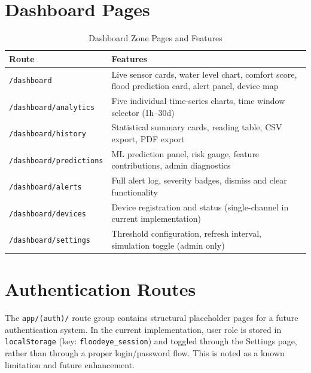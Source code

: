 \section{Dashboard Pages}

\begin{table}[H]
\centering
\caption{Dashboard Zone Pages and Features}
\begin{tabularx}{\linewidth}{|l|X|}
\hline
\rowcolor{FloodLight}
\textbf{Route} & \textbf{Features} \\
\hline
\texttt{/\allowbreak{}dashboard} & Live sensor cards, water level chart, comfort score, flood prediction card, alert panel, device map \\
\hline
\texttt{/\allowbreak{}dashboard/\allowbreak{}analytics} & Five individual time-series charts, time window selector (1h–30d) \\
\hline
\texttt{/\allowbreak{}dashboard/\allowbreak{}history} & Statistical summary cards, reading table, CSV export, PDF export \\
\hline
\texttt{/\allowbreak{}dashboard/\allowbreak{}predictions} & ML prediction panel, risk gauge, feature contributions, admin diagnostics \\
\hline
\texttt{/\allowbreak{}dashboard/\allowbreak{}alerts} & Full alert log, severity badges, dismiss and clear functionality \\
\hline
\texttt{/\allowbreak{}dashboard/\allowbreak{}devices} & Device registration and status (single-channel in current implementation) \\
\hline
\texttt{/\allowbreak{}dashboard/\allowbreak{}settings} & Threshold configuration, refresh interval, simulation toggle (admin only) \\
\hline
\end{tabularx}
\end{table}

\section{Authentication Routes}

The \texttt{app/\allowbreak{}(auth)/\allowbreak{}} route group contains structural placeholder pages for a future authentication system. In the current implementation, user role is stored in \texttt{localStorage} (key: \texttt{floodeye\_\allowbreak{}session}) and toggled through the Settings page, rather than through a proper login/password flow. This is noted as a known limitation and future enhancement.

